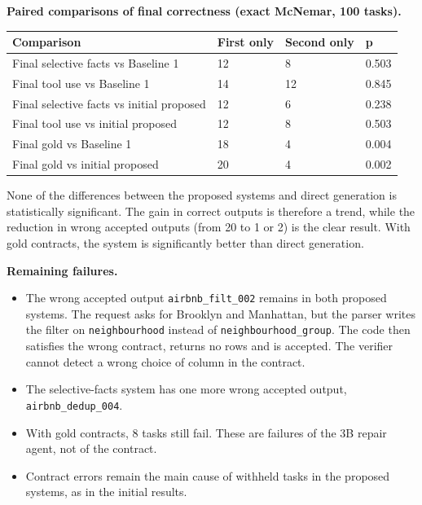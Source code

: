 \documentclass[11pt]{article}
\providecommand{\tightlist}{\setlength{\itemsep}{0pt}\setlength{\parskip}{0pt}}
\begin{document}
\textbf{Paired comparisons of final correctness (exact McNemar, 100
tasks).}

\begin{table}[!tp]
\centering\footnotesize\setlength{\tabcolsep}{3pt}\renewcommand{\arraystretch}{1.1}
\begin{tabularx}{\textwidth}{>{\raggedright\arraybackslash}Xlll}
\toprule
\textbf{Comparison} & \textbf{First only} & \textbf{Second only} & \textbf{p} \\
\midrule
Final selective facts vs Baseline 1 & 12 & 8 & 0.503 \\
Final tool use vs Baseline 1 & 14 & 12 & 0.845 \\
Final selective facts vs initial proposed & 12 & 6 & 0.238 \\
Final tool use vs initial proposed & 12 & 8 & 0.503 \\
Final gold vs Baseline 1 & 18 & 4 & 0.004 \\
Final gold vs initial proposed & 20 & 4 & 0.002 \\
\bottomrule
\end{tabularx}
\end{table}

None of the differences between the proposed systems and direct
generation is statistically significant. The gain in correct outputs is
therefore a trend, while the reduction in wrong accepted outputs (from
20 to 1 or 2) is the clear result. With gold contracts, the system is
significantly better than direct generation.

\textbf{Remaining failures.}

\begin{itemize}
\tightlist
\item
  The wrong accepted output
  \texttt{airbnb\_\allowbreak{}filt\_\allowbreak{}002} remains in both
  proposed systems. The request asks for Brooklyn and Manhattan, but the
  parser writes the filter on \texttt{neighbourhood} instead of
  \texttt{neighbourhood\_\allowbreak{}group}. The code then satisfies
  the wrong contract, returns no rows and is accepted. The verifier
  cannot detect a wrong choice of column in the contract.
\item
  The selective-facts system has one more wrong accepted output,
  \texttt{airbnb\_\allowbreak{}dedup\_\allowbreak{}004}.
\item
  With gold contracts, 8 tasks still fail. These are failures of the 3B
  repair agent, not of the contract.
\item
  Contract errors remain the main cause of withheld tasks in the
  proposed systems, as in the initial results.
\end{itemize}
\end{document}
